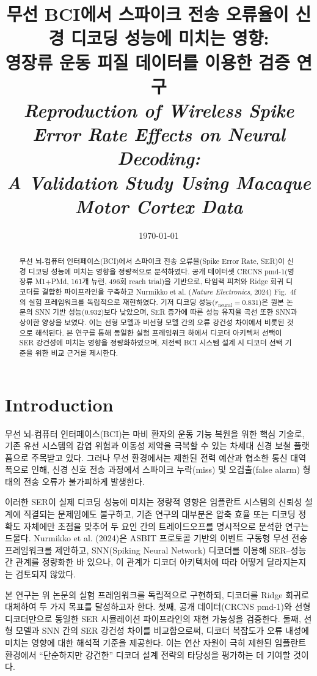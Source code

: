 \documentclass[12pt, a4paper]{article}
\title{%
  \textbf{무선 BCI에서 스파이크 전송 오류율이 신경 디코딩 성능에 미치는 영향:}\\
  \textbf{영장류 운동 피질 데이터를 이용한 검증 연구}\\[0.5em]
  \large\textit{Reproduction of Wireless Spike Error Rate Effects on Neural Decoding:\\
  A Validation Study Using Macaque Motor Cortex Data}
}
\author{}
\date{\today}
\begin{document}
\maketitle
\thispagestyle{empty}

\begin{abstract}
무선 뇌-컴퓨터 인터페이스(BCI)에서 스파이크 전송 오류율(Spike Error Rate, SER)이 신경 디코딩 성능에 미치는 영향을 정량적으로 분석하였다.
공개 데이터셋 CRCNS pmd-1(영장류 M1+PMd, 161개 뉴런, 496회 reach trial)을 기반으로, 타임랙 피처와 Ridge 회귀 디코더를 결합한 파이프라인을 구축하고
Nurmikko et al. (\textit{Nature Electronics}, 2024) Fig.\ 4f의 실험 프레임워크를 독립적으로 재현하였다.
기저 디코딩 성능($r_\text{neural} = 0.831$)은 원본 논문의 SNN 기반 성능(0.932)보다 낮았으며,
SER 증가에 따른 성능 유지율 곡선 또한 SNN과 상이한 양상을 보였다.
이는 선형 모델과 비선형 모델 간의 오류 강건성 차이에서 비롯된 것으로 해석된다.
본 연구를 통해 동일한 실험 프레임워크 하에서 디코더 아키텍처 선택이 SER 강건성에 미치는 영향을 정량화하였으며,
저전력 BCI 시스템 설계 시 디코더 선택 기준을 위한 비교 근거를 제시한다.
\end{abstract}

\newpage
\tableofcontents
\newpage

\section{Introduction}

무선 뇌-컴퓨터 인터페이스(BCI)는 마비 환자의 운동 기능 복원을 위한 핵심 기술로,
기존 유선 시스템의 감염 위험과 이동성 제약을 극복할 수 있는 차세대 신경 보철 플랫폼으로 주목받고 있다.
그러나 무선 환경에서는 제한된 전력 예산과 협소한 통신 대역폭으로 인해,
신경 신호 전송 과정에서 스파이크 누락(miss) 및 오검출(false alarm) 형태의 전송 오류가 불가피하게 발생한다.

이러한 SER이 실제 디코딩 성능에 미치는 정량적 영향은 임플란트 시스템의 신뢰성 설계에 직결되는 문제임에도 불구하고,
기존 연구의 대부분은 압축 효율 또는 디코딩 정확도 자체에만 초점을 맞추어
두 요인 간의 트레이드오프를 명시적으로 분석한 연구는 드물다.
Nurmikko et al. (2024)은 ASBIT 프로토콜 기반의 이벤트 구동형 무선 전송 프레임워크를 제안하고,
SNN(Spiking Neural Network) 디코더를 이용해 SER--성능 간 관계를 정량화한 바 있으나,
이 관계가 디코더 아키텍처에 따라 어떻게 달라지는지는 검토되지 않았다.

본 연구는 위 논문의 실험 프레임워크를 독립적으로 구현하되, 디코더를 Ridge 회귀로 대체하여 두 가지 목표를 달성하고자 한다.
첫째, 공개 데이터(CRCNS pmd-1)와 선형 디코더만으로 동일한 SER 시뮬레이션 파이프라인의 재현 가능성을 검증한다.
둘째, 선형 모델과 SNN 간의 SER 강건성 차이를 비교함으로써,
디코더 복잡도가 오류 내성에 미치는 영향에 대한 해석적 기준을 제공한다.
이는 연산 자원이 극히 제한된 임플란트 환경에서 ``단순하지만 강건한'' 디코더 설계 전략의 타당성을 평가하는 데 기여할 것이다.
\end{document}
